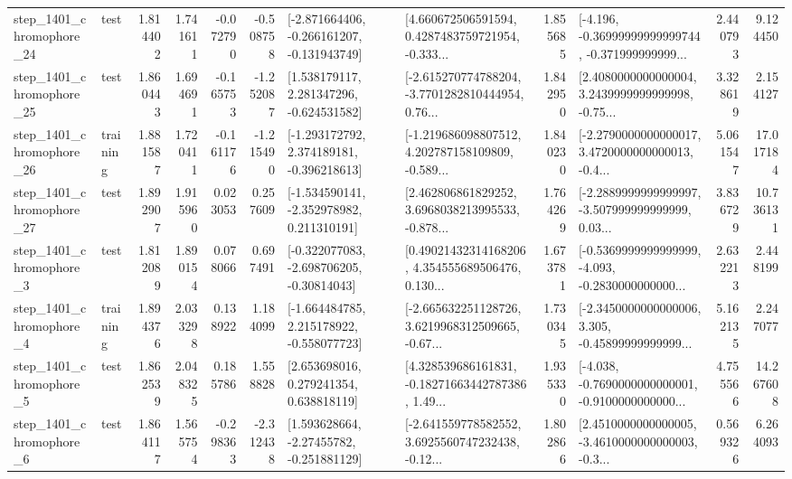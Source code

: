 \begin{tabular}{llrrrrllrlrr}
 step\_1401\_chromophore\_24 &      test &      1.814402 &    1.741611 &     -0.072790 & -0.508758 &  [-2.871664406, -0.266161207, -0.131943749] &  [4.660672506591594, 0.4287483759721954, -0.333... &       1.855685 &  [-4.196, -0.36999999999999744, -0.371999999999... &            2.440793 &          9.124450 \\
 step\_1401\_chromophore\_25 &      test &      1.860443 &    1.694691 &     -0.165753 & -1.252087 &    [1.538179117, 2.281347296, -0.624531582] &  [-2.615270774788204, -3.7701282810444954, 0.76... &       1.842950 &  [2.4080000000000004, 3.2439999999999998, -0.75... &            3.328619 &          2.154127 \\
 step\_1401\_chromophore\_26 &  training &      1.881587 &    1.720411 &     -0.161176 & -1.215490 &   [-1.293172792, 2.374189181, -0.396218613] &  [-1.219686098807512, 4.202787158109809, -0.589... &       1.840230 &  [-2.2790000000000017, 3.4720000000000013, -0.4... &            5.061547 &         17.017184 \\
 step\_1401\_chromophore\_27 &      test &      1.892907 &    1.915960 &      0.023053 &  0.257609 &   [-1.534590141, -2.352978982, 0.211310191] &  [2.462806861829252, 3.6968038213995533, -0.878... &       1.764269 &  [-2.2889999999999997, -3.507999999999999, 0.03... &            3.836729 &         10.736131 \\
  step\_1401\_chromophore\_3 &      test &      1.812089 &    1.890154 &      0.078066 &  0.697491 &   [-0.322077083, -2.698706205, -0.30814043] &  [0.49021432314168206, 4.354555689506476, 0.130... &       1.673781 &  [-0.5369999999999999, -4.093, -0.2830000000000... &            2.632213 &          2.448199 \\
  step\_1401\_chromophore\_4 &  training &      1.894376 &    2.033298 &      0.138922 &  1.184099 &   [-1.664484785, 2.215178922, -0.558077723] &  [-2.665632251128726, 3.6219968312509665, -0.67... &       1.730345 &  [-2.3450000000000006, 3.305, -0.45899999999999... &            5.162135 &          2.247077 \\
  step\_1401\_chromophore\_5 &      test &      1.862539 &    2.048325 &      0.185786 &  1.558828 &     [2.653698016, 0.279241354, 0.638818119] &  [4.328539686161831, -0.18271663442787386, 1.49... &       1.935330 &  [-4.038, -0.7690000000000001, -0.9100000000000... &            4.755566 &         14.267608 \\
  step\_1401\_chromophore\_6 &      test &      1.864117 &    1.565754 &     -0.298363 & -2.312438 &    [1.593628664, -2.27455782, -0.251881129] &  [-2.641559778582552, 3.6925560747232438, -0.12... &       1.802866 &  [2.4510000000000005, -3.4610000000000003, -0.3... &            0.569326 &          6.264093 \\

\end{tabular}
